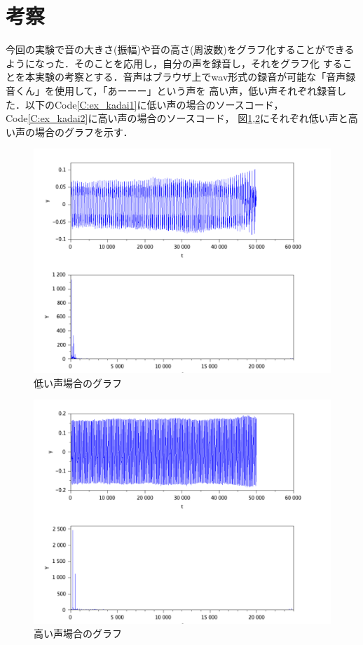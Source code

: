 \documentclass[a4paper,11pt]{jsarticle}
\begin{document}
\section{考察}
  今回の実験で音の大きさ(振幅)や音の高さ(周波数)をグラフ化することができるようになった．そのことを応用し，自分の声を録音し，それをグラフ化
  することを本実験の考察とする．音声はブラウザ上でwav形式の録音が可能な「音声録音くん」\cite{record}を使用して，「あーーー」という声を
  高い声，低い声それぞれ録音した．以下のCode\ref{C:ex_kadai1}に低い声の場合のソースコード，Code\ref{C:ex_kadai2}に高い声の場合のソースコード，
  図\ref{G:ex_kadai1},\ref{G:ex_kadai2}にそれぞれ低い声と高い声の場合のグラフを示す．
  
  \begin{figure}[H]
    \centering
    \includegraphics[width=0.8\linewidth]{picture/ex_kadai1.png}
    \caption{低い声場合のグラフ}
    \label{G:ex_kadai1}
  \end{figure}
  
  \begin{figure}[H]
    \centering
    \includegraphics[width=0.8\linewidth]{picture/ex_kadai2.png}
    \caption{高い声場合のグラフ}
    \label{G:ex_kadai2}
  \end{figure}
\end{document}
